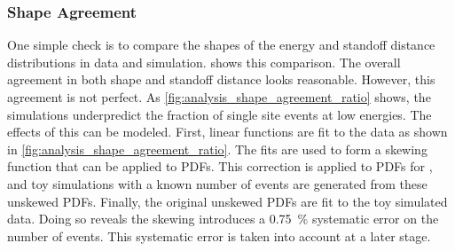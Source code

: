 \documentclass[herrin-thesis.tex]{subfiles}
\begin{document}
\subsubsection{Shape Agreement}
One simple check is to compare the shapes of the energy and standoff distance distributions in data and simulation.  shows this comparison. The overall agreement in both shape and standoff distance looks reasonable. However, this agreement is not perfect. As \cref{fig:analysis_shape_agreement_ratio} shows, the simulations underpredict the fraction of single site events at low energies. The effects of this can be modeled. First, linear functions are fit to the data as shown in \cref{fig:analysis_shape_agreement_ratio}. The fits are used to form a skewing function that can be applied to PDFs. This correction is applied to PDFs for \twonu{}, and toy simulations with a known number of \twonu{} events are generated from these unskewed PDFs. Finally, the original unskewed PDFs are fit to the toy simulated data. Doing so reveals the skewing introduces a \SI{0.75}{\percent} systematic error on the number of \twonu{} events. This systematic error is taken into account at a later stage.
\end{document}
